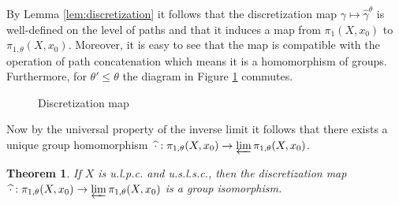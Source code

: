 \documentclass[a4paper, 11pt, twoside]{article}
\theoremstyle{break}
\newtheorem{thm}{Theorem}[section]
\theoremstyle{break}
\begin{document}
By Lemma \ref{lem:discretization} it follows that the discretization map $\gamma \mapsto \widehat{\gamma}^{\theta}$ is well-defined on the level of paths
and that it induces a map from $\pi_1(X, x_0)$ to $\pi_{1,\theta}(X, x_0)$. Moreover, it is easy to see that the map is compatible with the operation of path concatenation
which means it is a homomorphism of groups.
Furthermore, for $\theta' \leq \theta$ the diagram in Figure \ref{fig:discretization} commutes.

\begin{figure}[ht!]
  \centering
  \caption{Discretization map}\label{fig:discretization}
\end{figure}

Now by the universal property of the inverse limit it follows that there exists a unique group homomorphism $\: \widehat{\cdot} : \pi_{1,\theta}(X, x_0) \to \varprojlim \pi_{1,\theta}(X, x_0)$.

\begin{thm} \label{thm:isomorphism}
  If $X$ is u.l.p.c. and u.s.l.s.c., then the discretization map $\: \widehat{\cdot} : \pi_{1,\theta}(X, x_0) \to \varprojlim \pi_{1,\theta}(X, x_0)$ is a group isomorphism.
\end{thm}
\end{document}
